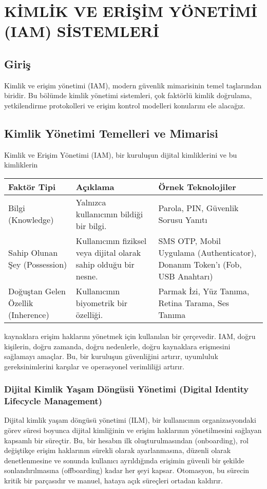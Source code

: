 \chapter{KİMLİK VE ERİŞİM YÖNETİMİ (IAM) SİSTEMLERİ}

\section*{Giriş}
Kimlik ve erişim yönetimi (IAM), modern güvenlik mimarisinin temel taşlarından biridir. Bu bölümde kimlik yönetimi sistemleri, çok faktörlü kimlik doğrulama, yetkilendirme protokolleri ve erişim kontrol modelleri konularını ele alacağız.

\section{Kimlik Yönetimi Temelleri ve Mimarisi}
Kimlik ve Erişim Yönetimi (IAM), bir kuruluşun dijital kimliklerini ve bu kimliklerin

\begin{tabularx}{\textwidth}{|l|X|X|}
\hline
\textbf{Faktör Tipi} & \textbf{Açıklama} & \textbf{Örnek Teknolojiler} \\
\hline
Bilgi (Knowledge) & Yalnızca kullanıcının bildiği bir bilgi. & Parola, PIN, Güvenlik Sorusu Yanıtı \\
\hline
Sahip Olunan Şey (Possession) & Kullanıcının fiziksel veya dijital olarak sahip olduğu bir nesne. & SMS OTP, Mobil Uygulama (Authenticator), Donanım Token'ı (Fob, USB Anahtarı) \\
\hline
Doğuştan Gelen Özellik (Inherence) & Kullanıcının biyometrik bir özelliği. & Parmak İzi, Yüz Tanıma, Retina Tarama, Ses Tanıma \\
\hline
\end{tabularx}

kaynaklara erişim haklarını yönetmek için kullanılan bir çerçevedir. IAM, doğru kişilerin, doğru zamanda, doğru nedenlerle, doğru kaynaklara erişmesini sağlamayı amaçlar. Bu, bir kuruluşun güvenliğini artırır, uyumluluk gereksinimlerini karşılar ve operasyonel verimliliği artırır.

\subsection{Dijital Kimlik Yaşam Döngüsü Yönetimi (Digital Identity Lifecycle Management)}

Dijital kimlik yaşam döngüsü yönetimi (ILM), bir kullanıcının organizasyondaki görev süresi boyunca dijital kimliğinin ve erişim haklarının yönetilmesini sağlayan kapsamlı bir süreçtir. Bu, bir hesabın ilk oluşturulmasından (onboarding), rol değiştikçe erişim haklarının sürekli olarak ayarlanmasına, düzenli olarak denetlenmesine ve sonunda kullanıcı ayrıldığında erişimin güvenli bir şekilde sonlandırılmasına (offboarding) kadar her şeyi kapsar. Otomasyon, bu sürecin kritik bir parçasıdır ve manuel, hataya açık süreçleri ortadan kaldırır.

